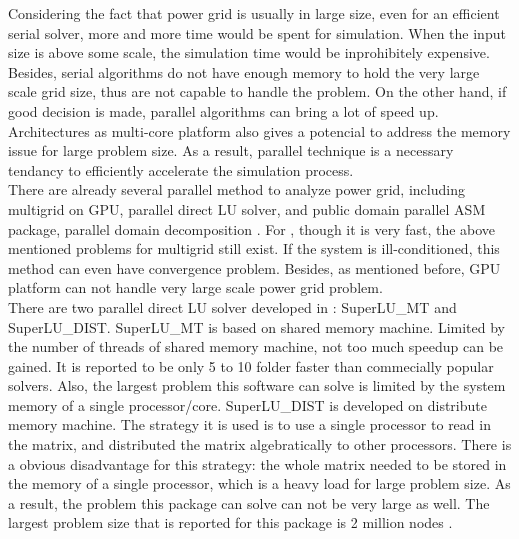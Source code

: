 \documentclass{sig-alternate}
\begin{document}
	Considering the fact that power grid is usually in large size, even for an efficient serial solver, more and more time would be
	spent for simulation. When the input size is above some scale, the simulation time would be inprohibitely expensive.
	Besides, serial algorithms do not have enough memory to hold the very large scale grid size, thus are not capable to handle 
	the problem. On the other hand, if good decision is made, parallel algorithms can bring a lot of speed up. Architectures as
	multi-core platform also gives a potencial to address the memory issue for large problem size. As a result, parallel technique
	is a necessary tendancy to efficiently accelerate the simulation process.\\ 

	There are already several parallel method to analyze power grid, including multigrid on GPU\cite{Zhuofeng}, parallel direct LU 
	solver\cite{Super_LU_website}, and public domain parallel ASM package\cite{PETSC_website}, parallel domain decomposition
	\cite{kaisun}\cite{voronov}. For \cite{Zhuofeng}, though it is very fast, the above mentioned problems for multigrid still exist. 
	If the system is ill-conditioned, this method can even have convergence problem. Besides, as mentioned before, GPU platform 
	can not handle very large scale power grid problem.\\
 
	There are two parallel direct LU solver developed in \cite{Super_LU_website}: SuperLU\_MT and SuperLU\_DIST. SuperLU\_MT is 
	based on shared memory machine. Limited by the number of threads of shared memory machine, not too much speedup can be gained. 
	It is reported to be only 5 to 10 folder faster than commecially popular solvers\cite{Super_LU_website}. Also, the largest problem
	this software can solve is limited by the system memory of a single processor/core. SuperLU\_DIST is developed on distribute 
	memory machine. The strategy it is used is to use a single processor to read in the matrix, and distributed the matrix 
	algebratically to other processors. There is a obvious disadvantage for this strategy: the whole matrix needed to be stored 
	in the memory of a single processor, which is a heavy load for large problem size. As a result, the problem this package can 
	solve can not be very large as well. The largest problem size that is reported for this package is 2 million nodes
	\cite{Super_LU_website}.\\
\end{document}
